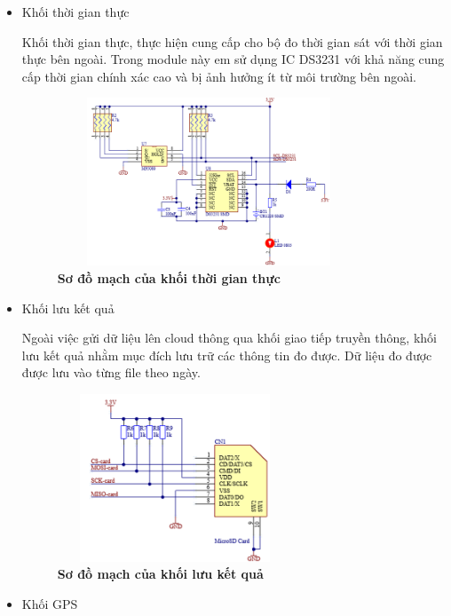\documentclass{article} %
\begin{document}
\begin{itemize}
		\newpage
		\item  Khối thời gian thực
		
		Khối thời gian thực, thực hiện cung cấp cho bộ đo thời gian sát với thời gian thực bên ngoài. Trong module này em sử dụng IC DS3231 với khả năng cung cấp thời gian chính xác cao và bị ảnh hưởng ít từ môi trường bên ngoài.
		
		\begin{figure}[!ht]
			\centering
			\includegraphics[width=9cm,height=5cm]{Images/RTC.png}
			\caption[Sơ đồ mạch của khối thời gian thực ]{\bfseries \fontsize{12pt}{0pt}\selectfont Sơ đồ mạch của khối thời gian thực }
			\label{RTC}
		\end{figure}


		
		\item Khối lưu kết quả
		
		Ngoài việc gửi dữ liệu lên cloud thông qua khối giao tiếp truyền thông, khối lưu kết quả nhằm mục đích lưu trữ các thông tin đo được. Dữ liệu đo được được lưu vào từng file theo ngày.
		
		\begin{figure}[!ht]
			\centering
			\includegraphics[width=7cm,height=5cm]{Images/Sdcard.png}
			\caption[Sơ đồ mạch của khối lưu kết quả ]{\bfseries \fontsize{12pt}{0pt}\selectfont Sơ đồ mạch của khối lưu kết quả }
			\label{Sdcard}
		\end{figure}
		
		\newpage
		\item Khối GPS
		

\end{itemize}
\end{document}
